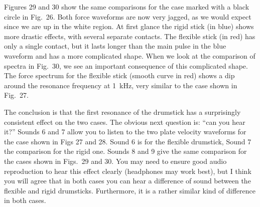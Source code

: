   Figures 29 and 30 show the same comparisons for the case marked with a black 
  circle in Fig.\ 26. Both force waveforms are now very jagged, as we would 
  expect since we are up in the white region. At first glance the rigid stick 
  (in blue) shows more drastic effects, with several separate contacts. The 
  flexible stick (in red) has only a single contact, but it lasts longer than 
  the main pulse in the blue waveform and has a more complicated shape. When we 
  look at the comparison of spectra in Fig.\ 30, we see an important 
  consequence of this complicated shape. The force spectrum for the flexible 
  stick (smooth curve in red) shows a dip around the resonance frequency at 
  1~kHz, very similar to the case shown in Fig.\ 27. 



  The conclusion is that the first resonance of the drumstick has a 
  surprisingly consistent effect on the two cases. The obvious next question 
  is: “can you hear it?” Sounds 6 and 7 allow you to listen to the two plate 
  velocity waveforms for the case shown in Figs 27 and 28. Sound 6 is for the 
  flexible drumstick, Sound 7 the comparison for the rigid one. Sounds 8 and 9 
  give the same comparison for the cases shown in Figs.\ 29 and 30. You may 
  need to ensure good audio reproduction to hear this effect clearly 
  (headphones may work best), but I think you will agree that in both cases you 
  can hear a difference of sound between the flexible and rigid drumsticks. 
  Furthermore, it is a rather similar kind of difference in both cases. 


